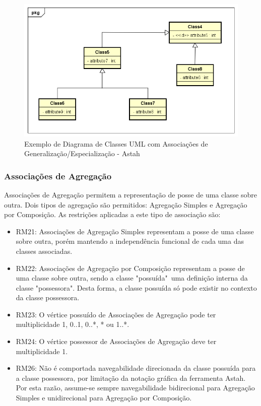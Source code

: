 \begin{figure}
    \begin{center}
        \includegraphics[scale=0.7]{imagens/Example_Realization.png}
    \end{center}
	\caption{\label{fig_example_realization}Exemplo de Diagrama de Classes UML com Associações de Generalização/Especialização - Astah}
\end{figure}


\subsubsection{Associações de Agregação}

Associações de Agregação permitem a representação de posse de uma classe sobre outra. Dois tipos de agregação são permitidos: Agregação Simples e Agregação por Composição. As restrições aplicadas a este tipo de associação são:

\begin{itemize}
    \item RM21: Associações de Agregação Simples representam a posse de uma classe sobre outra, porém mantendo a independência funcional de cada uma das classes associadas.
    
    \item RM22: Associações de Agregação por Composição representam a posse de uma classe sobre outra, sendo a classe "possuída"\ uma definição interna da classe "possessora". Desta forma, a classe possuída só pode existir no contexto da classe possessora.
    
    \item RM23: O vértice possuído de Associações de Agregação pode ter multiplicidade 1, 0..1, 0..*, * ou 1..*.
    
    \item RM24: O vértice possessor de Associações de Agregação deve ter multiplicidade 1.
    
    \item RM26: Não é comportada navegabilidade direcionada da classe possuída para a classe possessora, por limitação da notação gráfica da ferramenta Astah. Por esta razão, assume-se sempre navegabilidade bidirecional para Agregação Simples e unidirecional para Agregação por Composição.
\end{itemize}

